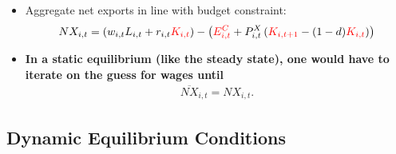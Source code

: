 \documentclass{article}
\begin{document}
\begin{itemize}
    \item Aggregate net exports in line with budget constraint:
    \begin{align}
        NX_{i,t} = \left( w_{i,t}L_{i,t} + r_{i,t}{\color{red}K_{i,t}} \right) - \left( {\color{red}E^C_{i,t}} + P^X_{i,t} \left( {\color{red}K_{i,t+1}} - (1-d) {\color{red}K_{i,t}}\right) \right)
    \end{align}
\end{itemize}

\begin{itemize}
    \item \textbf{In a static equilibrium (like the steady state), one would have to iterate on the guess for wages until}
    \begin{align}
        \overline{NX}_{i,t} = NX_{i,t}.
    \end{align}
\end{itemize}

\subsection{Dynamic Equilibrium Conditions}
\end{document}
